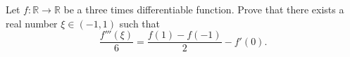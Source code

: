 Let \(f \colon \mathbb{R} \to \mathbb{R}\) be a three times differentiable function.
Prove that there exists a real number \(\xi \in (-1,1)\) such that
\[ \frac{f'''(\xi)}{6} = \frac{f(1) - f(-1)}{2} - f'(0) .  \]